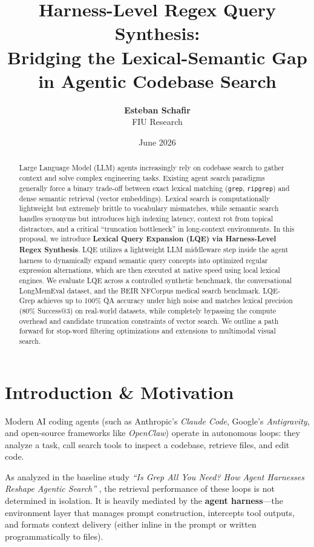 \documentclass[11pt,a4paper]{article}
\title{\textbf{Harness-Level Regex Query Synthesis:\\Bridging the Lexical-Semantic Gap in Agentic Codebase Search}}
\author{\textbf{Esteban Schafir} \\ FIU Research}
\date{June 2026}
\begin{document}
\maketitle

\begin{abstract}
Large Language Model (LLM) agents increasingly rely on codebase search to gather context and solve complex engineering tasks. Existing agent search paradigms generally force a binary trade-off between exact lexical matching (\texttt{grep}, \texttt{ripgrep}) and dense semantic retrieval (vector embeddings). Lexical search is computationally lightweight but extremely brittle to vocabulary mismatches, while semantic search handles synonyms but introduces high indexing latency, context rot from topical distractors, and a critical ``truncation bottleneck'' in long-context environments. In this proposal, we introduce \textbf{Lexical Query Expansion (LQE) via Harness-Level Regex Synthesis}. LQE utilizes a lightweight LLM middleware step inside the agent harness to dynamically expand semantic query concepts into optimized regular expression alternations, which are then executed at native speed using local lexical engines. We evaluate LQE across a controlled synthetic benchmark, the conversational LongMemEval dataset, and the BEIR NFCorpus medical search benchmark. LQE-Grep achieves up to 100\% QA accuracy under high noise and matches lexical precision (80\% Success@3) on real-world datasets, while completely bypassing the compute overhead and candidate truncation constraints of vector search. We outline a path forward for stop-word filtering optimizations and extensions to multimodal visual search.
\end{abstract}

\section{Introduction \& Motivation}
Modern AI coding agents (such as Anthropic's \textit{Claude Code}, Google's \textit{Antigravity}, and open-source frameworks like \textit{OpenClaw}) operate in autonomous loops: they analyze a task, call search tools to inspect a codebase, retrieve files, and edit code. 

As analyzed in the baseline study \textit{``Is Grep All You Need? How Agent Harnesses Reshape Agentic Search''} \cite{sen2026grep}, the retrieval performance of these loops is not determined in isolation. It is heavily mediated by the \textbf{agent harness}—the environment layer that manages prompt construction, intercepts tool outputs, and formats context delivery (either inline in the prompt or written programmatically to files).
\end{document}
